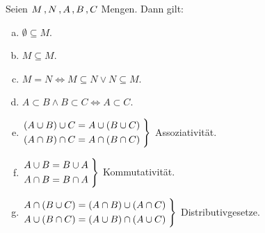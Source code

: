\documentclass[../ana1.tex]{subfiles}
\begin{document}
\begin{bem} Seien \(M\operatorname{,} N\operatorname{,} A\operatorname{,} B\operatorname{,} C\) Mengen. Dann gilt:
	\begin{enumerate}[(a)]
		\item \(\emptyset \subseteq M\).
		\item \(M \subseteq M\).
		\item \(M = N \iff M \subseteq N \vee N \subseteq M\).
		\item \(A\subset B \wedge B \subset C \iff A \subset C\).
		\item \(\begin{rcases*}
				(A\cup B) \cup C = A \cup (B \cup C)\;\\
				(A\cap B) \cap C = A \cap (B \cap C)\;
			  \end{rcases*}\) Assoziativität.
		\item \(\begin{rcases*}
			    A\cup B = B \cup A\;\\
		        A\cap B = B \cap A\;
			  \end{rcases*}\) Kommutativität.
		\item \(\begin{rcases*}
			    A \cap (B\cup C) = (A\cap B) \cup (A\cap C)\;\\
			    A \cup (B\cap C) = (A\cup B) \cap (A\cup C)\;
			  \end{rcases*}\) Distributivgesetze.
	\end{enumerate}
\end{bem}
\end{document}
